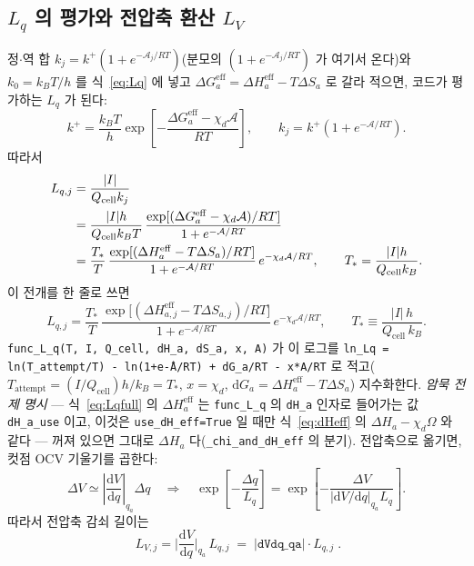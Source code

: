 \documentclass[11pt,a4paper]{article}
\newcommand{\dd}{\mathrm{d}}
\newcommand{\eff}{\mathrm{eff}}
\newcommand{\cell}{\mathrm{cell}}
\newcommand{\code}[1]{\texttt{#1}}
\begin{document}
\subsection{$L_q$ 의 평가와 전압축 환산 $L_V$}
정$\cdot$역 합 $k_j=k^+(1+e^{-\mathcal A_j/RT})$(분모의 $(1+e^{-\mathcal A_j/RT})$ 가 여기서 온다)와 $k_0=k_BT/h$ 를 식~\eqref{eq:Lq} 에 넣고 $\Delta G_a^\eff=\Delta H_a^\eff-T\Delta S_a$ 로 갈라 적으면,
코드가 평가하는 $L_q$ 가 된다:
\begin{equation}
k^+=\frac{k_BT}{h}\exp\!\left[-\frac{\Delta G_a^\eff-\chi_d\mathcal A}{RT}\right],
\qquad
k_j=k^+\left(1+e^{-\mathcal A/RT}\right).
\label{eq:LqfullderiveA}
\end{equation}
따라서
\begin{align}
L_{q,j}
&=\frac{|I|}{Q_\cell k_j}\notag\\
&=\frac{|I|h}{Q_\cell k_BT}\,
\frac{\exp[(\Delta G_a^\eff-\chi_d\mathcal A)/RT]}{1+e^{-\mathcal A/RT}}\notag\\
&=\frac{T_*}{T}\,
\frac{\exp[(\Delta H_a^\eff-T\Delta S_a)/RT]}{1+e^{-\mathcal A/RT}}\,
e^{-\chi_d\mathcal A/RT},
\qquad T_*=\frac{|I|h}{Q_\cell k_B}.
\label{eq:LqfullderiveB}
\end{align}
이 전개를 한 줄로 쓰면
\begin{equation}
L_{q,j}=\frac{T_*}{T}\,\frac{\exp\!\big[(\Delta H_{a,j}^\eff-T\Delta S_{a,j})/RT\big]}{1+e^{-\mathcal A/RT}}
\,e^{-\chi_d\mathcal A/RT},
\qquad T_*\equiv\frac{|I|\,h}{Q_\cell\,k_B}.
\label{eq:Lqfull}
\end{equation}
\code{func\_L\_q(T, I, Q\_cell, dH\_a, dS\_a, x, A)} 가 이 로그를
\code{ln\_Lq = ln(T\_attempt/T) - ln(1+e\^{-A/RT}) + dG\_a/RT - x*A/RT} 로 적고($T_\mathrm{attempt}=(I/Q_\cell)h/k_B=T_*$,
$x=\chi_d$, $\dd G_a=\Delta H_a^\eff-T\Delta S_a$) 지수화한다. \emph{암묵 전제 명시} — 식~\eqref{eq:Lqfull} 의
$\Delta H_a^\eff$ 는 \code{func\_L\_q} 의 \code{dH\_a} 인자로 들어가는 값 \code{dH\_a\_use} 이고, 이것은
\code{use\_dH\_eff=True} 일 때만 식~\eqref{eq:dHeff} 의 $\Delta H_a-\chi_d\Omega$ 와 같다 — 꺼져 있으면 그대로
$\Delta H_a$ 다(\code{\_chi\_and\_dH\_eff} 의 분기). 전압축으로 옮기면, 컷점 OCV 기울기를 곱한다:
\begin{equation}
\Delta V\simeq \left|\frac{\dd V}{\dd q}\right|_{q_a}\Delta q
\quad\Longrightarrow\quad
\exp\!\left[-\frac{\Delta q}{L_q}\right]
=\exp\!\left[-\frac{\Delta V}{|\dd V/\dd q|_{q_a}L_q}\right].
\label{eq:LVderive}
\end{equation}
따라서 전압축 감쇠 길이는
\begin{equation}
\boxed{\;L_{V,j}=\Big|\frac{\dd V}{\dd q}\Big|_{q_a}\,L_{q,j}\;=\;|\code{dVdq\_qa}|\cdot L_{q,j}\;.}
\label{eq:LV}
\end{equation}
\end{document}

